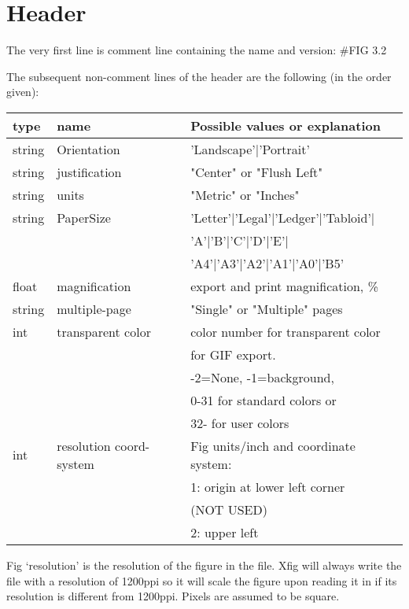 \documentclass[10pt, a4paper]{article}
\begin{document}
\section{Header}\label{sec:header}

The very first line is comment line containing the name and version:
        \#FIG 3.2


The subsequent non-comment lines of the header are the following 
(in the order given):

\begin{tabular}{|lll|}
\hline
type & name & Possible values or explanation \\
\hline
\hline
string & Orientation             & 'Landscape'|'Portrait' \\
string & justification           & "Center" or "Flush Left" \\
string & units                   & "Metric" or "Inches" \\
string & PaperSize               & 'Letter'|'Legal'|'Ledger'|'Tabloid'|\\
&&                                 'A'|'B'|'C'|'D'|'E'|\\
&&                                 'A4'|'A3'|'A2'|'A1'|'A0'|'B5' \\
float  & magnification           & export and print magnification, \% \\
string & multiple-page           & "Single" or "Multiple" pages \\
int    & transparent color       & color number for transparent color \\
&&                                 for GIF export. \\
&&                                -2=None, -1=background, \\
&&                                0-31 for standard colors or \\
&&                                32- for user colors \\
int    & resolution coord-system & Fig units/inch and coordinate system:\\
&&                                 1: origin at lower left corner \\
&&                                    (NOT USED)\\
&&                                 2: upper left \\
\hline
\end{tabular}



 Fig `resolution' is the resolution of the figure in the file.
    Xfig will always write the file with a resolution of 1200ppi so it
    will scale the figure upon reading it in if its resolution is different
    from 1200ppi.  Pixels are assumed to be square.
\end{document}
